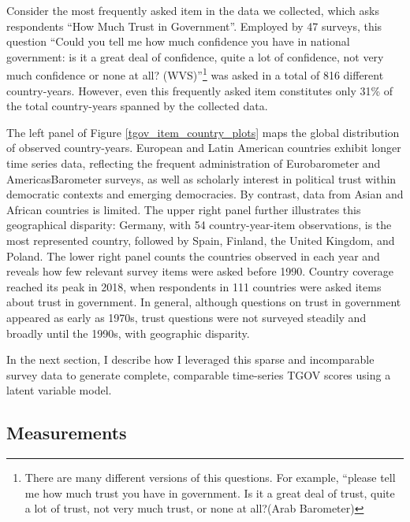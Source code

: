 \documentclass[
  12pt,
]{article}
\begin{document}
Consider the most frequently asked item in the data we collected, which asks respondents ``How Much Trust in Government''.
Employed by 47 surveys, this question ``Could you tell me how much confidence you have in national government: is it a great deal of confidence, quite a lot of confidence, not very much confidence or none at all? (WVS)''\footnote{There are many different versions of this questions. For example, ``please tell me how much trust you have in government. Is it a great deal of trust, quite a lot of trust, not very much trust, or none at all?(Arab Barometer)} was asked in a total of 816 different country-years.
However, even this frequently asked item constitutes only 31\% of the total country-years spanned by the collected data.

The left panel of Figure \nobreakspace{}\ref{tgov_item_country_plots} maps the global distribution of observed country-years.
European and Latin American countries exhibit longer time series data, reflecting the frequent administration of Eurobarometer and AmericasBarometer surveys, as well as scholarly interest in political trust within democratic contexts and emerging democracies.
By contrast, data from Asian and African countries is limited.
The upper right panel further illustrates this geographical disparity: Germany, with 54 country-year-item observations, is the most represented country, followed by Spain, Finland, the United Kingdom, and Poland.
The lower right panel counts the countries observed in each year and reveals how few relevant survey items were asked before 1990.
Country coverage reached its peak in 2018, when respondents in 111 countries were asked items about trust in government.
In general, although questions on trust in government appeared as early as 1970s, trust questions were not surveyed steadily and broadly until the 1990s, with geographic disparity.

In the next section, I describe how I leveraged this sparse and incomparable survey data to generate complete, comparable time-series TGOV scores using a latent variable model.

\subsection{Measurements}\label{measurements}
\end{document}
